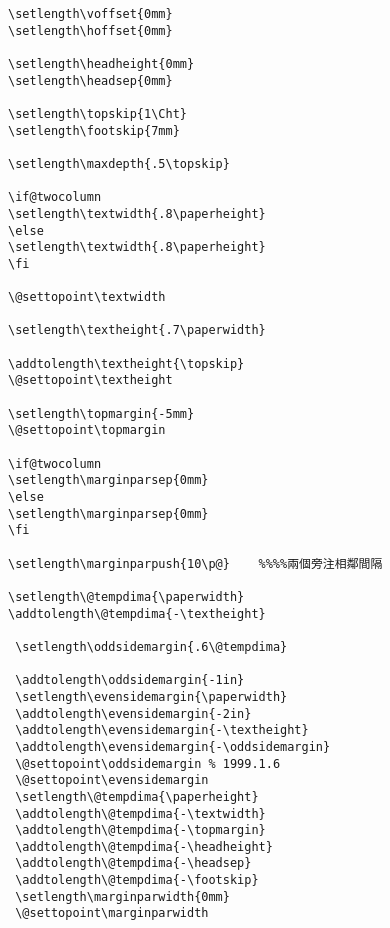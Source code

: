 \begin{lstlisting}[firstnumber=209]
\setlength\voffset{0mm}
\setlength\hoffset{0mm}

\setlength\headheight{0mm}
\setlength\headsep{0mm}

\setlength\topskip{1\Cht}
\setlength\footskip{7mm}

\setlength\maxdepth{.5\topskip}

\if@twocolumn
\setlength\textwidth{.8\paperheight}
\else
\setlength\textwidth{.8\paperheight}
\fi

\@settopoint\textwidth

\setlength\textheight{.7\paperwidth}

\addtolength\textheight{\topskip}
\@settopoint\textheight

\setlength\topmargin{-5mm}
\@settopoint\topmargin

\if@twocolumn
\setlength\marginparsep{0mm}
\else
\setlength\marginparsep{0mm}
\fi

\setlength\marginparpush{10\p@}    %%%%兩個旁注相鄰間隔

\setlength\@tempdima{\paperwidth}
\addtolength\@tempdima{-\textheight}

 \setlength\oddsidemargin{.6\@tempdima}

 \addtolength\oddsidemargin{-1in}
 \setlength\evensidemargin{\paperwidth}
 \addtolength\evensidemargin{-2in}
 \addtolength\evensidemargin{-\textheight}
 \addtolength\evensidemargin{-\oddsidemargin}
 \@settopoint\oddsidemargin % 1999.1.6
 \@settopoint\evensidemargin
 \setlength\@tempdima{\paperheight}
 \addtolength\@tempdima{-\textwidth}
 \addtolength\@tempdima{-\topmargin}
 \addtolength\@tempdima{-\headheight}
 \addtolength\@tempdima{-\headsep}
 \addtolength\@tempdima{-\footskip}
 \setlength\marginparwidth{0mm}
 \@settopoint\marginparwidth


\end{lstlisting}
